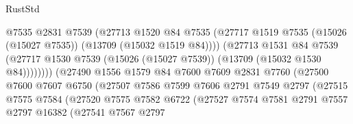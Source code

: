 \begin{lexlean}{RustStd}
\begin{coremodule}
                                      @7535
                                      @2831
                                      @7539
                                      (@27713
                                        @1520
                                        @84
                                        @7535
                                        (@27717
                                          @1519
                                          @7535
                                          (@15026 (@15027 @7535))
                                          (@13709 (@15032 @1519 @84))))
                                      (@27713
                                        @1531
                                        @84
                                        @7539
                                        (@27717
                                          @1530
                                          @7539
                                          (@15026 (@15027 @7539))
                                          (@13709 (@15032 @1530 @84))))))))
                              (@27490
                                @1556
                                @1579
                                @84
                                @7600
                                @7609
                                @2831
                                @7760
                                (@27500
                                  @7600
                                  @7607
                                  @6750
                                  (@27507
                                    @7586
                                    @7599
                                    @7606
                                    @2791
                                    @7549
                                    @2797
                                    (@27515
                                      @7575
                                      @7584
                                      (@27520
                                        @7575
                                        @7582
                                        @6722
                                        (@27527
                                          @7574
                                          @7581
                                          @2791
                                          @7557
                                          @2797
                                          @16382
                                          (@27541
                                            @7567
                                            @2797

\end{coremodule}
\end{lexlean}
